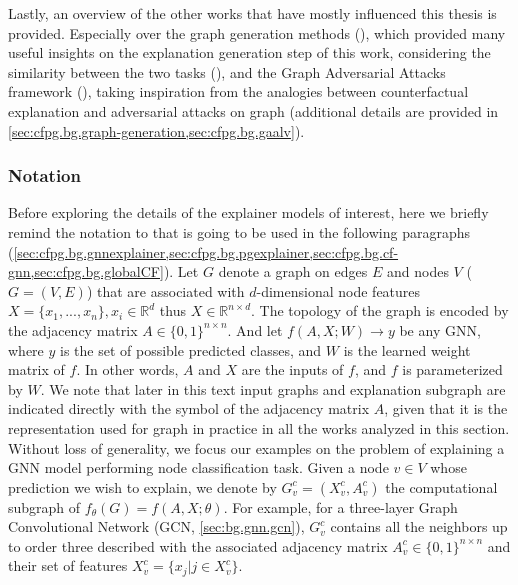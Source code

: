 \documentclass[binding=0.6cm]{sapthesis}
\newcommand{\mycite}[1]{(\cite{#1})}
\begin{document}
Lastly, an overview of the other works that have mostly influenced this thesis is provided. Especially over the graph generation methods \mycite{liu2019-cgvae,du2022-mdvae}, which provided many useful insights on the explanation generation step of this work, considering the similarity between the two tasks \mycite{zhu2022-survey-generation}, and the Graph Adversarial Attacks framework \mycite{bose2020-gaalvae}, taking inspiration from the analogies between counterfactual explanation and adversarial attacks on graph (additional details are provided in \cref{sec:cfpg.bg.graph-generation,sec:cfpg.bg.gaalv}). 


\subsubsection{Notation}
\label{sec:cfpg.bg.notation}
Before exploring the details of the explainer models of interest, here we briefly remind the notation to that is going to be used in the following paragraphs (\cref{sec:cfpg.bg.gnnexplainer,sec:cfpg.bg.pgexplainer,sec:cfpg.bg.cf-gnn,sec:cfpg.bg.globalCF}). Let $G$ denote a graph on edges $E$ and nodes $V$ ($G=(V,E)$) that are associated with $d$-dimensional node features $X = \{x_1 , . . . , x_n\}, x_i \in \mathbb{R}^d$ thus $X \in \mathbb{R}^{n\times d}$. The topology of the graph is encoded by the adjacency matrix $A \in \{0,1\}^{n\times n}$. And let $f(A, X; W ) \rightarrow y$ be any GNN, where $y$ is the set of possible predicted classes, and $W$ is the learned weight matrix of $f$. In other words, $A$ and $X$ are the inputs of $f$, and $f$ is parameterized by $W$. We note that later in this text input graphs and explanation subgraph are indicated directly with the symbol of the adjacency matrix $A$, given that it is the representation used for graph in practice in all the works analyzed in this section. 
Without loss of generality, we focus our examples on the problem of explaining a GNN model performing node classification task. Given a node $v \in V$ whose prediction we wish to explain, we denote by $G^c_v = (X^c_v, A^c_v)$ the computational subgraph of $f_{\theta}(G) = f(A, X; \theta)$. For example, for a three-layer Graph Convolutional Network (GCN, \cref{sec:bg.gnn.gcn}), $G^c_v$ contains all the neighbors up to order three described with the associated adjacency matrix $A^c_v \in \{0, 1\}^{n\times n}$ and their set of features $X^c_v = \{x_j | j \in X^c_v\}$.
\end{document}
